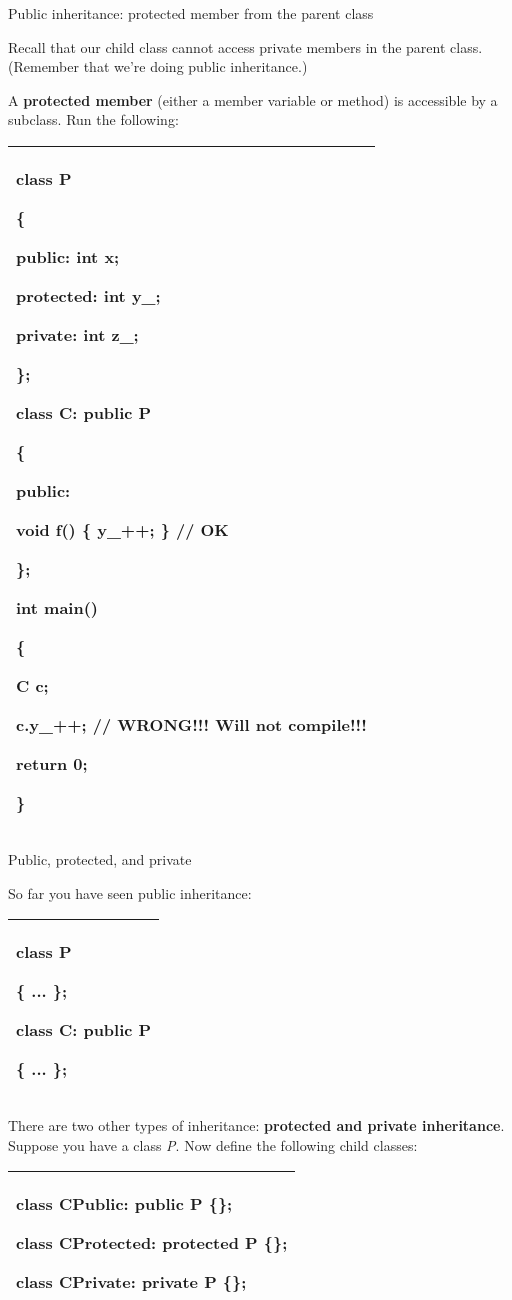 \documentclass[
]{article}
\begin{document}
Public inheritance: protected member from the parent class

Recall that our child class cannot access private members in the parent
class. (Remember that we're doing public inheritance.)

A \textbf{protected member} (either a member variable or method) is
accessible by a subclass. Run the following:

\begin{longtable}[]{@{}l@{}}
\toprule
\endhead
\begin{minipage}[t]{0.97\columnwidth}\raggedright
class P

\{

public: int x;

protected: int y\_;

private: int z\_;

\};

class C: public P

\{

public:

void f() \{ y\_++; \} // OK

\};

int main()

\{

C c;

\textbf{c.y\_++;} // WRONG!!! Will not compile!!!

return 0;

\}\strut
\end{minipage}\tabularnewline
\bottomrule
\end{longtable}

Public, protected, and private

So far you have seen public inheritance:

\begin{longtable}[]{@{}l@{}}
\toprule
\endhead
\begin{minipage}[t]{0.97\columnwidth}\raggedright
class P

\{ ... \};

class C: \textbf{public} P

\{ ... \};\strut
\end{minipage}\tabularnewline
\bottomrule
\end{longtable}

There are two other types of inheritance: \textbf{protected and private
inheritance}. Suppose you have a class \emph{P}. Now define the
following child classes:

\begin{longtable}[]{@{}l@{}}
\toprule
\endhead
\begin{minipage}[t]{0.97\columnwidth}\raggedright
class CPublic: public P \{\};

class CProtected: protected P \{\};

class CPrivate: private P \{\};\strut
\end{minipage}\tabularnewline
\bottomrule
\end{longtable}
\end{document}
